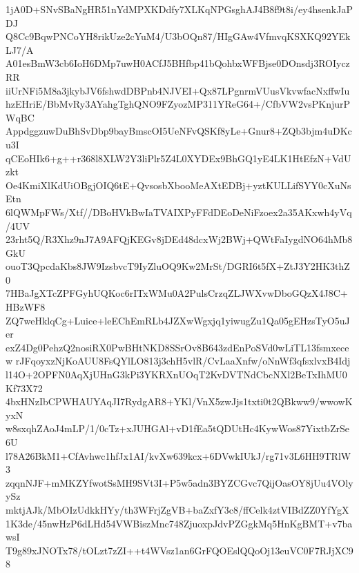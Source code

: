 1jA0D+SNvSBaNgHR51nYdMPXKDdfy7XLKqNPGsghAJ4B8f9t8i/ey4hsenkJaPDJ
Q8Cc9BqwPNCoYH8rikUze2cYuM4/U3bOQn87/HIgGAw4VfmvqKSXKQ92YEkLJ7/A
A01esBmW3cb6IoH6DMp7uwH0ACfJ5BHfbp41bQohbxWFBjse0DOnsdj3ROIyczRR
iiUrNFi5M8a3jkybJV6fshwdDBPnb4NJVEI+Qx87LPgnrmVUusVkvwfacNxffwIu
hzEHriE/BbMvRy3AYahgTghQNO9FZyozMP311YReG64+/CfbVW2vsPKnjurPWqBC
AppdggzuwDuBhSvDbp9bayBmscOI5UeNFvQSKf8yLe+Gnur8+ZQb3bjm4uDKcu3I
qCEoHIk6+g++r368l8XLW2Y3liPlr5Z4L0XYDEx9BhGQ1yE4LK1HtEfzN+VdUzkt
Oe4KmiXlKdUiOBgjOIQ6tE+QvsosbXbooMeAXtEDBj+yztKULLifSYY0cXuNsEtn
6lQWMpFWs/Xtf//DBoHVkBwIaTVAIXPyFFdDEoDeNiFzoex2a35AKxwh4yVq/4UV
23rht5Q/R3Xhz9nJ7A9AFQjKEGv8jDEd48dcxWj2BWj+QWtFaIygdNO64hMb8GkU
ouoT3QpcdaKbs8JW9IzsbvcT9IyZluOQ9Kw2MrSt/DGRI6t5fX+ZtJ3Y2HK3thZ0
7HBaJgXTcZPFGyhUQKoc6rITxWMu0A2PulsCrzqZLJWXvwDboGQzX4J8C+HBzWF8
ZQ7weHklqCg+Luice+leEChEmRLb4JZXwWgxjq1yiwugZu1Qa05gEHzsTyO5uJer
exZ4Dg0PehzQ2nosiRX0PwBHtNKD8SSrOv8B643zdEnPoSVd0wLiTL13fsmxecew
rJFqoyxzNjKoAUU8FsQYlLO813j3chH5vlR/CvLaaXnfw/oNnWf3qfsxlvxB4Idj
l14O+2OPFN0AqXjUHnG3kPi3YKRXnUOqT2KvDVTNdCbcNXl2BeTxIhMU0Kf73X72
4bxHNzIbCPWHAUYAqJI7RydgAR8+YKl/VnX5zwJjs1txti0t2QBkww9/wwowKyxN
w8sxqhZAoJ4mLP/1/0cTz+xJUHGAl+vD1fEa5tQDUtHc4KywWos87YixtbZrSe6U
l78A26BkM1+CfAvhwc1hfJx1AI/kvXw639kcx+6DVwkIUkJ/rg71v3L6HH9TRlW3
zqqnNJF+mMKZYfwotSsMH9SVt3I+P5w5adn3BYZCGvc7QijOasOY8jUu4VOlyySz
mktjAJk/MbOIzUdkkHYy/th3WFrjZgVB+baZxfY3c8/ffCelk4ztVIBdZZ0YfYgX
1K3de/45nwHzP6dLHd54VWBiszMnc748ZjuoxpJdvPZGgkMq5HnKgBMT+v7bawsI
T9g89xJNOTx78/tOLzt7zZI++t4WVsz1an6GrFQOEslQQoOj13euVC0F7RJjXC98
